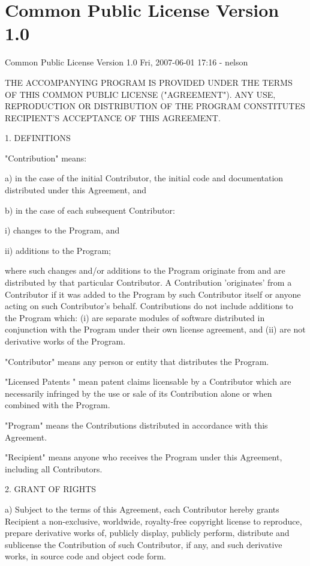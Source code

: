 
\section{Common Public License Version 1.0\label{sec:Common-Public-License}}

Common Public License Version 1.0
Fri, 2007-06-01 17:16 - nelson

THE ACCOMPANYING PROGRAM IS PROVIDED UNDER THE TERMS OF THIS COMMON PUBLIC LICENSE ("AGREEMENT"). ANY USE, REPRODUCTION OR DISTRIBUTION OF THE PROGRAM CONSTITUTES RECIPIENT'S ACCEPTANCE OF THIS AGREEMENT.

1. DEFINITIONS

"Contribution" means:

a) in the case of the initial Contributor, the initial code and documentation distributed under this Agreement, and

b) in the case of each subsequent Contributor:

i) changes to the Program, and

ii) additions to the Program;

where such changes and/or additions to the Program originate from and are distributed by that particular Contributor. A Contribution 'originates' from a Contributor if it was added to the Program by such Contributor itself or anyone acting on such Contributor's behalf. Contributions do not include additions to the Program which: (i) are separate modules of software distributed in conjunction with the Program under their own license agreement, and (ii) are not derivative works of the Program.

"Contributor" means any person or entity that distributes the Program.

"Licensed Patents " mean patent claims licensable by a Contributor which are necessarily infringed by the use or sale of its Contribution alone or when combined with the Program.

"Program" means the Contributions distributed in accordance with this Agreement.

"Recipient" means anyone who receives the Program under this Agreement, including all Contributors.

2. GRANT OF RIGHTS

a) Subject to the terms of this Agreement, each Contributor hereby grants Recipient a non-exclusive, worldwide, royalty-free copyright license to reproduce, prepare derivative works of, publicly display, publicly perform, distribute and sublicense the Contribution of such Contributor, if any, and such derivative works, in source code and object code form.


